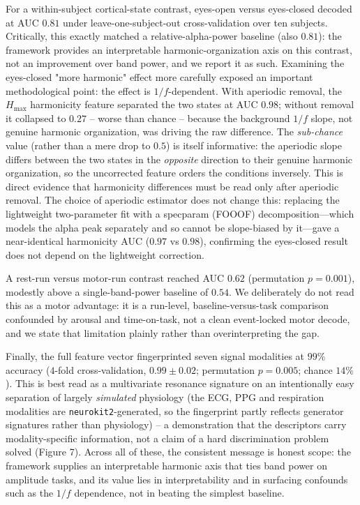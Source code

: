 \documentclass[11pt]{article}
\begin{document}
For a within-subject cortical-state contrast, eyes-open versus eyes-closed decoded at AUC $0.81$ under leave-one-subject-out cross-validation over ten subjects. Critically, this exactly matched a relative-alpha-power baseline (also $0.81$): the framework provides an interpretable harmonic-organization axis on this contrast, not an improvement over band power, and we report it as such. Examining the eyes-closed "more harmonic" effect more carefully exposed an important methodological point: the effect is $1/f$-dependent. With aperiodic removal, the $H_{\max}$ harmonicity feature separated the two states at AUC $0.98$; without removal it collapsed to $0.27$ -- worse than chance -- because the background $1/f$ slope, not genuine harmonic organization, was driving the raw difference. The \emph{sub-chance} value (rather than a mere drop to $0.5$) is itself informative: the aperiodic slope differs between the two states in the \emph{opposite} direction to their genuine harmonic organization, so the uncorrected feature orders the conditions inversely. This is direct evidence that harmonicity differences must be read only after aperiodic removal. The choice of aperiodic estimator does not change this: replacing the lightweight two-parameter fit with a specparam (FOOOF) decomposition---which models the alpha peak separately and so cannot be slope-biased by it---gave a near-identical harmonicity AUC ($0.97$ vs $0.98$), confirming the eyes-closed result does not depend on the lightweight correction.

A rest-run versus motor-run contrast reached AUC $0.62$ (permutation $p = 0.001$), modestly above a single-band-power baseline of $0.54$. We deliberately do not read this as a motor advantage: it is a run-level, baseline-versus-task comparison confounded by arousal and time-on-task, not a clean event-locked motor decode, and we state that limitation plainly rather than overinterpreting the gap.

Finally, the full feature vector fingerprinted seven signal modalities at $99\%$ accuracy ($4$-fold cross-validation, $0.99 \pm 0.02$; permutation $p = 0.005$; chance $14\%$). This is best read as a multivariate resonance signature on an intentionally easy separation of largely \emph{simulated} physiology (the ECG, PPG and respiration modalities are \texttt{neurokit2}-generated, so the fingerprint partly reflects generator signatures rather than physiology) -- a demonstration that the descriptors carry modality-specific information, not a claim of a hard discrimination problem solved (Figure 7). Across all of these, the consistent message is honest scope: the framework supplies an interpretable harmonic axis that ties band power on amplitude tasks, and its value lies in interpretability and in surfacing confounds such as the $1/f$ dependence, not in beating the simplest baseline.
\end{document}
